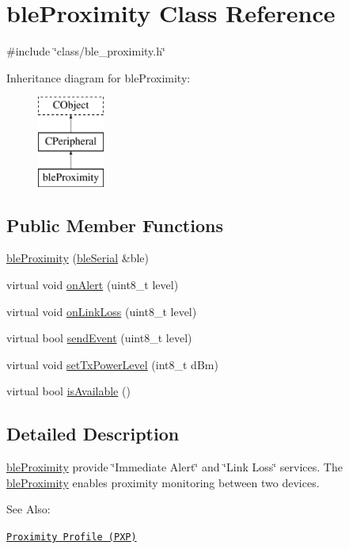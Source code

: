 \hypertarget{classble_proximity}{\section{ble\-Proximity Class Reference}
\label{classble_proximity}
}


{\ttfamily \#include \char`\"{}class/ble\-\_\-proximity.\-h\char`\"{}}

Inheritance diagram for ble\-Proximity\-:\begin{figure}[H]
\begin{center}
\leavevmode
\includegraphics[height=3.000000cm]{de/d67/classble_proximity}
\end{center}
\end{figure}
\subsection*{Public Member Functions}
\begin{DoxyCompactItemize}
\item 
\hyperlink{classble_proximity_a3cbf3bd31cac77037d623ef9c8098a71}{ble\-Proximity} (\hyperlink{classble_serial}{ble\-Serial} \&ble)
\item 
virtual void \hyperlink{classble_proximity_a43c9187ddcb7237099ff414b74c5b0bd}{on\-Alert} (uint8\-\_\-t level)
\item 
virtual void \hyperlink{classble_proximity_a193eb5410fc4cf4b35613ad931ae61ff}{on\-Link\-Loss} (uint8\-\_\-t level)
\item 
virtual bool \hyperlink{classble_proximity_a6d3426d21b9182c5b3e135dd783e097d}{send\-Event} (uint8\-\_\-t level)
\item 
virtual void \hyperlink{classble_proximity_a177463a01974a439c9f8d90b36cf15e1}{set\-Tx\-Power\-Level} (int8\-\_\-t d\-Bm)
\item 
virtual bool \hyperlink{classble_proximity_adc2ab90789ee61d11031ce816b3db11c}{is\-Available} ()
\end{DoxyCompactItemize}


\subsection{Detailed Description}
\hyperlink{classble_proximity}{ble\-Proximity} provide \char`\"{}\-Immediate Alert\char`\"{} and \char`\"{}\-Link Loss\char`\"{} services. The \hyperlink{classble_proximity}{ble\-Proximity} enables proximity monitoring between two devices.\par
 See Also\-:\par
 \href{https://developer.bluetooth.org/TechnologyOverview/Pages/PXP.aspx}{\tt Proximity Profile (P\-X\-P)} 

